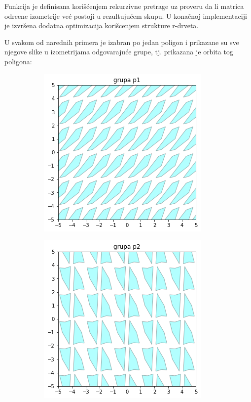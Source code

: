 \documentclass[11pt]{article}
\begin{document}
Funkcija je definisana kori\v s\' cenjem rekurzivne pretrage uz proveru da li matrica odre\dj ene izometrije ve\' c postoji u rezultuju\' cem skupu. U kona\v cnoj implementaciji je izvr\v sena dodatna optimizacija kori\v scenjem strukture r-drveta.

U svakom od narednih primera je izabran po jedan poligon i prikazane su sve njegove slike u izometrijama odgovaraju\' ce grupe, tj. prikazana je orbita tog poligona:

\begin{figure}[H]
  \begin{subfigure}[b]{0.22\textwidth}
    \includegraphics[width=\textwidth]{output_87_1.png}
    \label{fig:f10}
  \end{subfigure}
  \begin{subfigure}[b]{0.22\textwidth}
    \includegraphics[width=\textwidth]{output_87_2.png}

\end{subfigure}
\end{figure}
\end{document}
